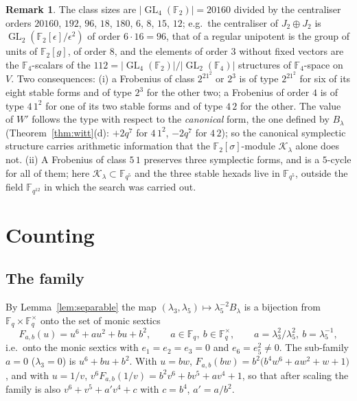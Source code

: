 \documentclass[12pt,a4paper]{amsart}
\theoremstyle{definition}
\newtheorem{remark}[theorem]{Remark}
\newcommand{\F}{\mathbb{F}}
\newcommand{\GL}{\operatorname{GL}}
\newcommand{\Kk}{\mathcal{K}}
\begin{document}
\begin{remark}
The class sizes are $|\GL_4(\F_2)|=20160$ divided by the centraliser orders $20160$, $192$, $96$, $18$, $180$, $6$, $8$, $15$, $12$; e.g.\ the centraliser of $J_2\oplus J_2$ is $\GL_2(\F_2[\epsilon]/\epsilon^2)$ of order $6\cdot16=96$, that of a regular unipotent is the group of units of $\F_2[g]$, of order $8$, and the elements of order $3$ without fixed vectors are the $\F_4$-scalars of the $112=|\GL_4(\F_2)|/|\GL_2(\F_4)|$ structures of $\F_4$-space on $V$. Two consequences: (i) a Frobenius of class $2^21^2$ or $2^3$ is of type $2^21^2$ for six of its eight stable forms and of type $2^3$ for the other two; a Frobenius of order $4$ is of type $4\,1^2$ for one of its two stable forms and of type $4\,2$ for the other. The value of $W'$ follows the type with respect to the \emph{canonical} form, the one defined by $B_\lambda$ (Theorem~\ref{thm:witt}(d): $+2q^7$ for $4\,1^2$, $-2q^7$ for $4\,2$); so the canonical symplectic structure carries arithmetic information that the $\F_2[\sigma]$-module $\Kk_\lambda$ alone does not. (ii) A Frobenius of class $5\,1$ preserves three symplectic forms, and is a $5$-cycle for all of them; here $\Kk_\lambda\subset\F_{q^5}$ and the three stable hexads live in $\F_{q^5}$, outside the field $\F_{q^{12}}$ in which the search was carried out.
\end{remark}

\section{Counting}\label{sec:counting}

\subsection{The family}
By Lemma~\ref{lem:separable} the map $(\lambda_3,\lambda_5)\mapsto\lambda_5^{-2}B_\lambda$ is a bijection from $\F_q\times\F_q^\times$ onto the set of monic sextics
\begin{equation}\label{eq:family}
F_{a,b}(u)=u^6+au^2+bu+b^2,\qquad a\in\F_q,\ b\in\F_q^\times,\qquad a=\lambda_3^2/\lambda_5^2,\ b=\lambda_5^{-1},
\end{equation}
i.e.\ onto the monic sextics with $e_1=e_2=e_3=0$ and $e_6=e_5^2\ne0$. The sub-family $a=0$ ($\lambda_3=0$) is $u^6+bu+b^2$. With $u=bw$, $F_{a,b}(bw)=b^2\bigl(b^4w^6+aw^2+w+1\bigr)$, and with $u=1/v$, $v^6F_{a,b}(1/v)=b^2v^6+bv^5+av^4+1$, so that after scaling the family is also $v^6+v^5+a'v^4+c$ with $c=b^4$, $a'=a/b^2$.
\end{document}
